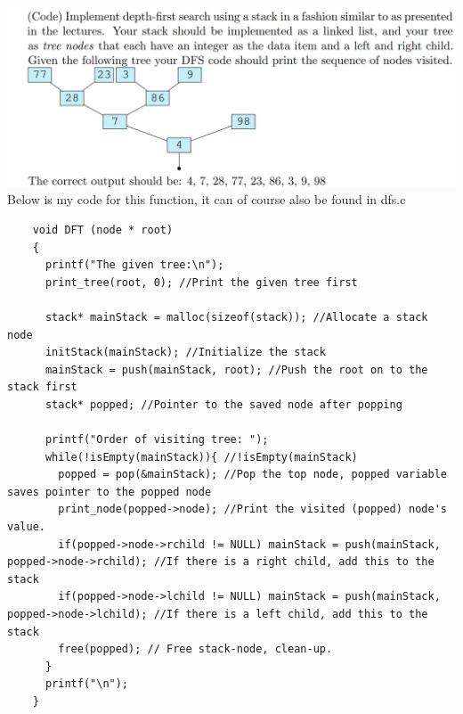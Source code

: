 \documentclass{article}
\begin{document}
\pagebreak
\includegraphics[width=\linewidth, keepaspectratio=true]{task4}
Below is my code for this function, it can of course also be found in dfs.c
\begin{lstlisting}
    void DFT (node * root)
    {
      printf("The given tree:\n");
      print_tree(root, 0); //Print the given tree first
    
      stack* mainStack = malloc(sizeof(stack)); //Allocate a stack node
      initStack(mainStack); //Initialize the stack
      mainStack = push(mainStack, root); //Push the root on to the stack first
      stack* popped; //Pointer to the saved node after popping
    
      printf("Order of visiting tree: ");
      while(!isEmpty(mainStack)){ //!isEmpty(mainStack)
        popped = pop(&mainStack); //Pop the top node, popped variable saves pointer to the popped node
        print_node(popped->node); //Print the visited (popped) node's value.
        if(popped->node->rchild != NULL) mainStack = push(mainStack, popped->node->rchild); //If there is a right child, add this to the stack
        if(popped->node->lchild != NULL) mainStack = push(mainStack, popped->node->lchild); //If there is a left child, add this to the stack
        free(popped); // Free stack-node, clean-up.
      }
      printf("\n");
    }
\end{lstlisting}


\vspace{2pt}
\end{document}
